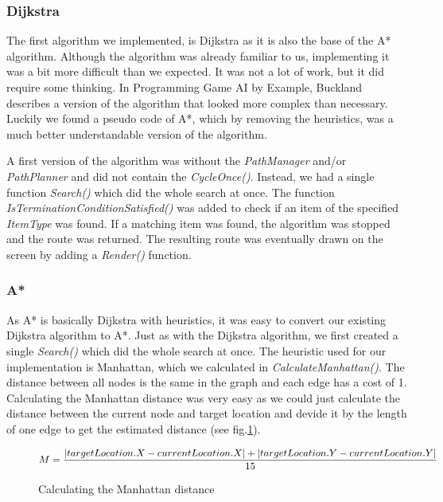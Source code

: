 \documentclass[11pt]{article}
\begin{document}
    \subsubsection{Dijkstra}\label{sec:pathDijkstra}
    The first algorithm we implemented, is Dijkstra as it is also the base of the A* algorithm.
    Although the algorithm was already familiar to us, implementing it was a bit more difficult than we expected.
    It was not a lot of work, but it did require some thinking.
    In Programming Game AI by Example, Buckland describes a version of the algorithm that looked more complex than necessary.
    Luckily we found a pseudo code\cite{aapc} of A*, which by removing the heuristics, was a much better understandable version of the algorithm.\par
    
    A first version of the algorithm was without the \textit{PathManager} and/or \textit{PathPlanner} and did not contain the \textit{CycleOnce()}.
    Instead, we had a single function \textit{Search()} which did the whole search at once.
    The function \textit{IsTerminationConditionSatisfied()} was added to check if an item of the specified \textit{ItemType} was found.
    If a matching item was found, the algorithm was stopped and the route was returned.
    The resulting route was eventually drawn on the screen by adding a \textit{Render()} function.
    
    \subsubsection{A*}\label{sec:pathAstar}
    As A* is basically Dijkstra with heuristics, it was easy to convert our existing Dijkstra algorithm to A*.
    Just as with the Dijkstra algorithm, we first created a single \textit{Search()} which did the whole search at once.
    The heuristic used for our implementation is Manhattan, which we calculated in \textit{CalculateManhattan()}.
    The distance between all nodes is the same in the graph and each edge has a cost of 1.
    Calculating the Manhattan distance was very easy as we could just calculate the distance between the current node and target location
    and devide it by the length of one edge to get the estimated distance (see fig.\ref{fig:pathPlanCalcManhattan}).

    \begin{figure}[h!]

        \[ $$M = \dfrac{|targetLocation.X - currentLocation.X| + |targetLocation.Y - currentLocation.Y|}{15}\]

        \caption{Calculating the Manhattan distance}

        \label{fig:pathPlanCalcManhattan}

    \end{figure}
    
\end{document}
